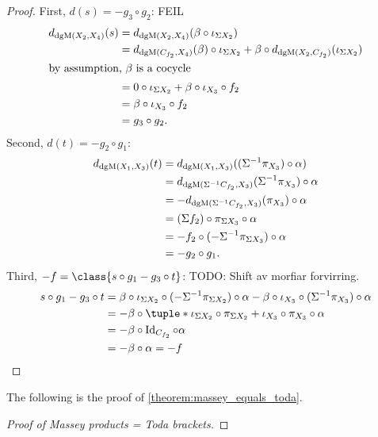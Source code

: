 \begin{proof}
    First, \( d(s) = -g_3 \circ g_2 \): FEIL
    \begin{align*}
        d_{\operatorname{dgM}(X_2, X_4)}(s) &= d_{\operatorname{dgM}(X_2, X_4)}(\beta \circ \iota_{\Sigma X_2}) \\
        &= d_{\operatorname{dgM}(C_{f_2}, X_4)}(\beta) \circ \iota_{\Sigma X_2} + \beta \circ d_{\operatorname{dgM}(X_2, C_{f_2})}(\iota_{\Sigma X_2}) \\
        \intertext{by assumption, \( \beta \) is a cocycle}
        &= 0 \circ \iota_{\Sigma X_2} + \beta \circ \iota_{X_3} \circ f_2 \\
        &= \beta \circ \iota_{X_3} \circ f_2 \\
        &= g_3 \circ g_2.
    \end{align*}
    Second, \( d(t) = - g_2 \circ g_1 \):
    \begin{align*}
         d_{\operatorname{dgM}(X_1, X_3)}(t) &= d_{\operatorname{dgM}(X_1, X_3)}((\Sigma^{-1} \pi_{X_3}) \circ \alpha) \\
         &= d_{\operatorname{dgM}(\Sigma^{-1} C_{f_2}, X_3)}(\Sigma^{-1} \pi_{X_3}) \circ \alpha \\
         &= - d_{\operatorname{dgM}(\Sigma^{-1} C_{f_2}, X_3)}(\pi_{X_3}) \circ \alpha \\
         &= (\Sigma f_2) \circ \pi_{\Sigma X_3} \circ \alpha \\
         &= - f_2 \circ (- \Sigma^{-1} \pi_{\Sigma X_3}) \circ \alpha \\
         &= - g_2 \circ g_1.
    \end{align*}
    Third, \( -f = \class{s \circ g_1 - g_3 \circ t} \): TODO: Shift av morfiar forvirring.
    \begin{align*}
        s \circ g_1 - g_3 \circ t &= \beta \circ \iota_{\Sigma X_2} \circ (-\Sigma^{-1} \pi_{\Sigma X_2}) \circ \alpha - \beta \circ \iota_{X_3} \circ (\Sigma^{-1} \pi_{X_3}) \circ \alpha \\
        &= - \beta \circ \tuple*{\iota_{\Sigma X_2} \circ \pi_{\Sigma X_2} + \iota_{X_3} \circ \pi_{X_3}} \circ \alpha \\
        &= - \beta \circ \Id_{C_{f_2}} \circ \alpha \\
        &= - \beta \circ \alpha = - f
    \end{align*}
\end{proof}

The following is the proof of \autoref{theorem:massey_equals_toda}.

\begin{proof}[Proof of Massey products = Toda brackets]
    
\end{proof}